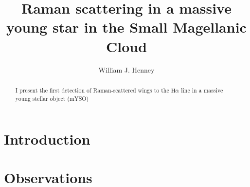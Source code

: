 \documentclass[twocolumn, times]{aastex631}
\newcommand\ha{\ensuremath{\text{H}\alpha}}
\begin{document}
\title{Raman scattering in a massive young star in the Small Magellanic Cloud}
\author{William J. Henney}

\begin{abstract}
  I present the first detection of Raman-scattered wings to the \ha{} line in a massive young stellar object (mYSO)
\end{abstract}



\section{Introduction}
\label{sec:introduction}




\section{Observations}
\label{sec:observations}
\end{document}
